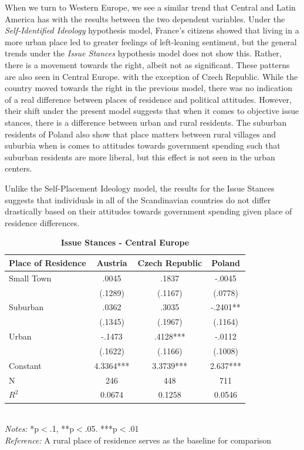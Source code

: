\documentclass[12pt, titlepage]{article}
\newcommand\e{\emph}
\newcommand\tb{\textbf}
\begin{document}
When we turn to Western Europe, we see a similar trend that Central and Latin America has with the results between the two dependent variables. Under the \e{Self-Identified Ideology} hypothesis model, France's citizens showed that living in a more urban place led to greater feelings of left-leaning sentiment, but the general trends under the \e{Issue Stances} hypothesis model does not show this. Rather, there is a movement towards the right, albeit not as significant. These patterns are also seen in Central Europe. with the exception of Czech Republic. While the country moved towards the right in the previous model, there was no indication of a real difference between places of residence and political attitudes. However, their shift under the present model suggests that when it comes to objective issue stances, there is a difference between urban and rural residents. The suburban residents of Poland also show that place matters between rural villages and suburbia when is comes to attitudes towards government spending such that suburban residents are more liberal, but this effect is not seen in the urban centers.

Unlike the Self-Placement Ideology model, the results for the Issue Stances suggests that individuals in all of the Scandinavian countries do not differ drastically based on their attitudes towards government spending given place of residence differences. 

\begin{singlespace}
	\begin{table}[H]
		\centering
		\caption{\tb{Issue Stances - Central Europe}}
		\begin{tabulary}{\linewidth}{l c c c }
			
			\hline
			\tb{Place of Residence} &\tb{Austria}&\tb{Czech Republic}& \tb{Poland} \\
			\hline
			Small Town &.0045 &.1837  &-.0045   \\
			&(.1289)&(.1167) &(.0778)  \\
			Suburban& .0362 &.3035  &-.2401**   \\
			&(.1345) &(.1967) &(.1164)\\
			Urban&-.1473&.4128***  &-.0112    \\
			&(.1622)& (.1166)  &(.1008)    \\
			Constant&4.3364*** &3.3739***  &2.637***     \\
			N&246 & 448  & 711   \\
			$R^2$&0.0674&0.1258  &0.0546  \\
			\hline 
\end{tabulary}
\\
\e{Notes:} *p$<$.1, **p$<$.05. ***p$<$.01 \\
\e{Reference:} A rural place of residence serves as the baseline for comparison
\label{CELib}
\end{table}
\end{singlespace}
\end{document}
